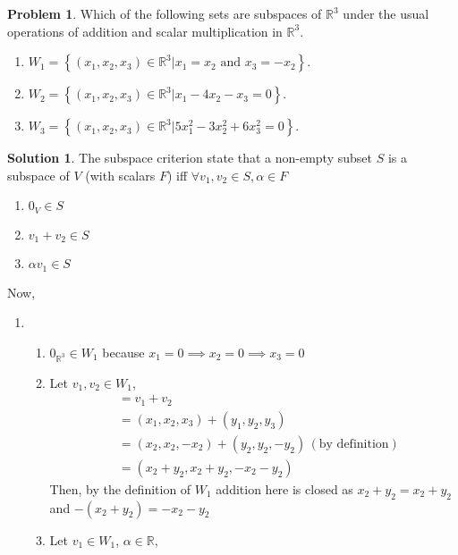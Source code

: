 \documentclass[10pt]{article}
\theoremstyle{definition}
\newtheorem{problem}{Problem}
\newtheorem{soln}{Solution}
\begin{document}
\begin{problem}
Which of the following sets are subspaces of $\mathbb{R}^3$ under the usual operations of addition and scalar multiplication in $\mathbb{R}^3$.
\begin{enumerate}[label=(\alph*)]
  \item $\displaystyle W_1 = \left\{(x_1, x_2, x_3) \in\mathbb{R}^3|x_1= x_2 \text{ and } x_3=-x_2\right\}.$
  \item $\displaystyle W_2 = \left\{(x_1, x_2, x_3) \in\mathbb{R}^3|x_1-4x_2-x_3=0\right\}.$
  \item $\displaystyle W_3 = \left\{(x_1, x_2, x_3) \in\mathbb{R}^3|5x_1^2-3x_2^2+6x_3^2=0\right\}.$
\end{enumerate}
\end{problem}
\begin{soln}
  The subspace criterion state that a non-empty subset $S$ is a subspace of $V$ (with scalars $F$) iff $\forall v_1,v_2\in S,\alpha\in F$
  \begin{enumerate}[label=(\roman*)]
    \item $0_V\in S$
    \item $v_1+v_2\in S$
    \item $\alpha v_1\in S$
  \end{enumerate}
  Now,
  \begin{enumerate}[label=(\alph*)]
    \item \begin{enumerate}[label=(\roman*)]
            \item $0_{\mathbb{R}^3}\in W_1$ because $x_1=0\implies x_2=0\implies x_3=0$
            \item Let $v_1,v_2\in W_1$,
                  \begin{align*}
                     & = v_1+v_2                                               \\
                     & = (x_1,x_2,x_3)+(y_1,y_2,y_3)                           \\
                     & = (x_2,x_2,-x_2)+(y_2,y_2,-y_2)\,(\text{by definition}) \\
                     & = (x_2+y_2,x_2+y_2,-x_2-y_2)
                  \end{align*}
                  Then, by the definition of $W_1$ addition here is closed as $x_2+y_2=x_2+y_2$ and $-(x_2+y_2)=-x_2-y_2$
            \item Let $v_1\in W_1$, $\alpha\in\mathbb{R}$,
                  \begin{align*}

\end{align*}
\end{enumerate}
\end{enumerate}
\end{soln}
\end{document}

